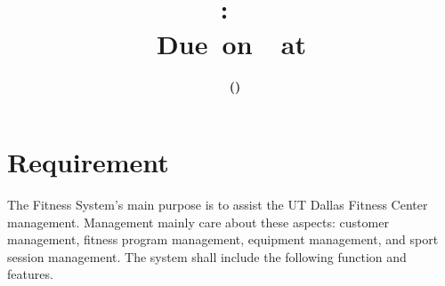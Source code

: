 \documentclass[12pt,letterpaper,titlepage,en-US]{article}
\title{
    \vspace{2in}
    \textmd{\textbf{\hmwkClassName \\\hmwkClass:\ \hmwkTitle }}\\
    \normalsize\vspace{0.1in}\small{Due\ on\ \DTMusedate{DueDate}\ at \DTMusetime{DueDate} }\\
    \vspace{0.1in}\large{\textit{\hmwkClassInstructor}}
    \vspace{3in}
}
\author{\textbf{\hmwkAuthorName\ \footnotesize{(\hmwkAuthorNetID)}} \\ }
\date{}
\begin{document}
\maketitle


\tableofcontents

\pagebreak
{}



\section{Requirement}
The Fitness System’s main purpose is to assist the UT Dallas Fitness Center management. Management mainly care about these aspects: customer management, fitness program management, equipment management, and sport session management. The system shall include the following function and features.
\end{document}
